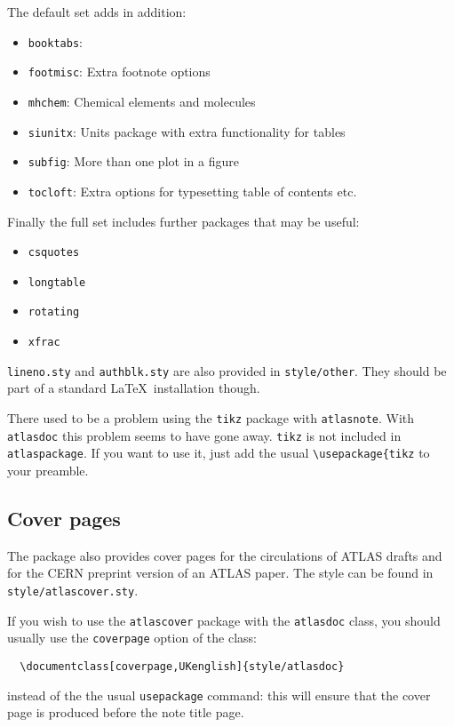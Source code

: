 \documentclass[koma,UKenglish]{style/atlasdoc}
\begin{document}
The default set adds in addition:
\begin{itemize}\setlength{\parskip}{0pt}\setlength{\itemsep}{0pt}
\item \texttt{booktabs}:
\item \texttt{footmisc}: Extra footnote options
\item \texttt{mhchem}: Chemical elements and molecules
\item \texttt{siunitx}: Units package with extra functionality for tables
\item \texttt{subfig}: More than one plot in a figure
\item \texttt{tocloft}: Extra options for typesetting table of contents etc.
\end{itemize}

Finally the full set includes further packages that may be useful:
\begin{itemize}\setlength{\parskip}{0pt}\setlength{\itemsep}{0pt}
\item \texttt{csquotes}
\item \texttt{longtable}
\item \texttt{rotating}
\item \texttt{xfrac}
\end{itemize}

\texttt{lineno.sty} and \texttt{authblk.sty} are also provided in \texttt{style/other}.
They should be part of a standard \LaTeX\ installation though.

There used to be a problem using the \texttt{tikz} package with \texttt{atlasnote}.
With \texttt{atlasdoc} this problem seems to have gone away.
\texttt{tikz} is not included in \texttt{atlaspackage}.
If you want to use it, just add the usual \verb|\usepackage{tikz| to your preamble.


\subsection{Cover pages}
\label{sec:cover}

The package also provides cover pages for the circulations of ATLAS drafts and 
for the CERN preprint version of an ATLAS paper. The style can be found in \texttt{style/atlascover.sty}.

If you wish to use the \texttt{atlascover} package with the 
\texttt{atlasdoc} class, you should usually use the \texttt{coverpage} option of the class:
\begin{verbatim}
  \documentclass[coverpage,UKenglish]{style/atlasdoc}
\end{verbatim}
instead of the the usual \texttt{usepackage} command: this will ensure
that the cover page is produced before the note title page.
\end{document}
